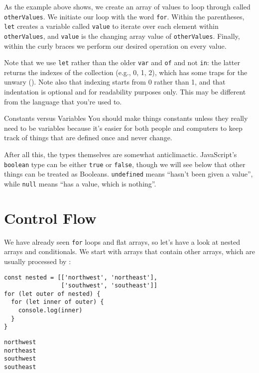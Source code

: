 As the example above shows, we create an array of values to loop through called \texttt{otherValues}.
We initiate our loop with the word \texttt{for}.
Within the parentheses, \texttt{let} creates a variable called \texttt{value} to iterate over each element within \texttt{otherValues},
and \texttt{value} is the changing array value of \texttt{otherValues}.
Finally, within the curly braces we perform our desired operation on every value.

Note that we use \texttt{let} rather than the older \texttt{var} and \texttt{of} and not \texttt{in}:
the latter returns the indexes of the collection (e.g., 0, 1, 2),
which has some traps for the unwary ().
Note also that indexing starts from 0 rather than 1,
and that indentation is optional and for readability purposes only.
This may be different from the language that you're used to.

\begin{aside}{Constants versus Variables}
  You should make things constants unless they really need to be variables
  because it's easier for both people and computers to keep track of things
  that are defined once and never change.
\end{aside}

After all this,
the types themselves are somewhat anticlimactic.
JavaScript's \texttt{boolean} type can be either \texttt{true} or \texttt{false},
though we will see below that other things can be treated as Booleans.
\texttt{undefined} means ``hasn't been given a value'',
while \texttt{null} means ``has a value, which is nothing''.

\section{Control Flow}\label{s:basics-control-flow}

We have already seen \texttt{for} loops and flat arrays,
so let's have a look at nested arrays and conditionals.
We start with arrays that contain other arrays,
which are usually processed by :

\begin{verbatim}
const nested = [['northwest', 'northeast'],
                ['southwest', 'southeast']]
for (let outer of nested) {
  for (let inner of outer) {
    console.log(inner)
  }
}
\end{verbatim}

\begin{verbatim}
northwest
northeast
southwest
southeast
\end{verbatim}

